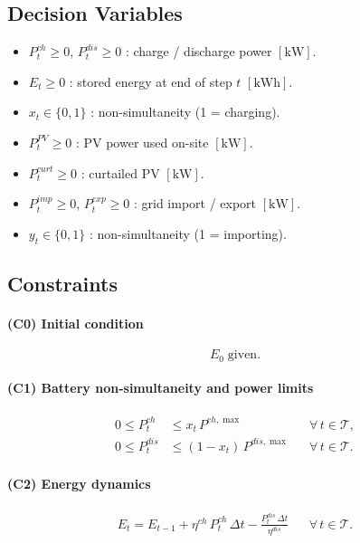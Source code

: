 \documentclass{article}
\begin{document}
\subsection{Decision Variables}

\begin{itemize}
  \item $P^{ch}_t \ge 0$, $P^{dis}_t \ge 0$ : charge / discharge power $[\mathrm{kW}]$.
  \item $E_t \ge 0$                           : stored energy at end of step $t$ $[\mathrm{kWh}]$.
  \item $x_t \in \{0,1\}$                    : non-simultaneity (1 = charging).
  \item $P^{PV}_t \ge 0$                     : PV power used on-site $[\mathrm{kW}]$.
  \item $P^{curt}_t \ge 0$                   : curtailed PV $[\mathrm{kW}]$.
  \item $P^{imp}_t \ge 0$, $P^{exp}_t \ge 0$ : grid import / export $[\mathrm{kW}]$.
  \item $y_t \in \{0,1\}$                    : non-simultaneity (1 = importing).
\end{itemize}

\subsection{Constraints}

\paragraph{(C0) Initial condition}
\[
  E_0 \;\text{given.}
\]

\paragraph{(C1) Battery non-simultaneity and power limits}
\begin{align}
  0 \le P^{ch}_t   &\le x_t \, P^{ch,\max}       && \forall\,t \in \mathcal{T}, \label{eq:C1_ch} \\
  0 \le P^{dis}_t  &\le (1-x_t)\,P^{dis,\max}    && \forall\,t \in \mathcal{T}. \label{eq:C1_dis}
\end{align}

\paragraph{(C2) Energy dynamics}
\begin{align}
  E_t = E_{t-1}
        + \eta^{ch}\,P^{ch}_t\,\Delta t
        - \frac{P^{dis}_t\,\Delta t}{\eta^{dis}}
  && \forall\,t \in \mathcal{T}. \label{eq:C2}
\end{align}
\end{document}
